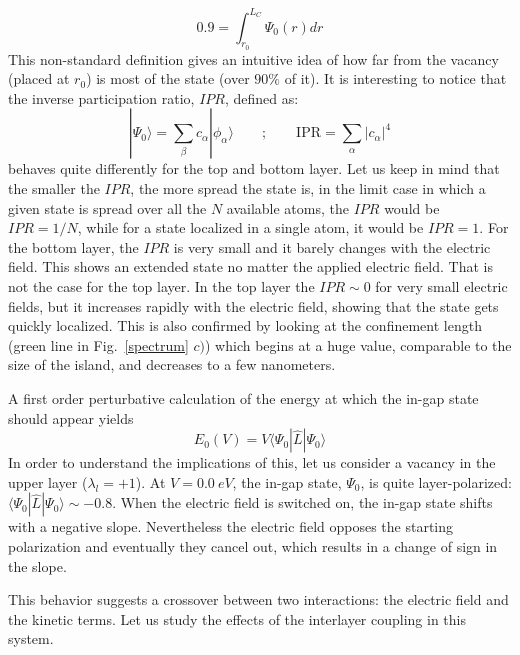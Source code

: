 \documentclass[a4paper]{article}
\newcommand{\ket}[1]{|#1\rangle}
\newcommand{\bra}[1]{\langle#1|}
\begin{document}
\begin{equation}
  0.9 = \int_{r_0}^{L_C} \Psi_0(r) dr   %
\end{equation}
This non-standard definition gives an intuitive idea of how far from the vacancy (placed at $r_0$) is most of the state (over $90\%$ of it).
It is interesting to notice that the inverse participation ratio, $IPR$, defined as:
\begin{equation}
  \ket{\Psi_0} = \sum_\beta c_\alpha\ket{\phi_\alpha}\quad\quad;\quad\quad
  \text{IPR} = \sum_\alpha |c_\alpha|^4
\end{equation}
behaves quite differently for the top and bottom layer. Let us keep in mind that the smaller the $IPR$, the more spread the state is, in the limit case in which a given state is spread over all the $N$ available atoms, the $IPR$ would be $IPR=1/N$, while for a state localized in a single atom, it would be $IPR=1$.
For the bottom layer, the $IPR$ is very small and it barely changes with the electric field. This shows an extended state no matter the applied electric field. That is not the case for the top layer. In the top layer the $IPR\sim0$ for very small electric fields, but it increases rapidly with the electric field, showing that the state gets quickly localized. This is also confirmed by looking at the confinement length (green line in Fig.~\ref{spectrum} $c)$) which begins at a huge value, comparable to the size of the island, and decreases to a few nanometers.


A first order perturbative calculation of the energy at which the in-gap state should appear yields
\begin{equation}
  E_0 (V) = V \bra{\Psi_0}\hat{L}\ket{\Psi_0}
\end{equation}
In order to understand the implications of this, let us consider a vacancy in the upper layer ($\lambda_l=+1$). At $V=\SI{0.0}{eV}$, the in-gap state, $\Psi_0$, is quite layer-polarized: $\bra{\Psi_0}\hat{L}\ket{\Psi_0}\sim-0.8$. When the electric field is switched on, the in-gap state shifts with a negative slope. Nevertheless the electric field opposes the starting polarization and eventually they cancel out, which results in a change of sign in the slope. %

This behavior suggests a crossover between two interactions: the electric field and the kinetic terms. Let us study the effects of the interlayer coupling in this system.
\end{document}
